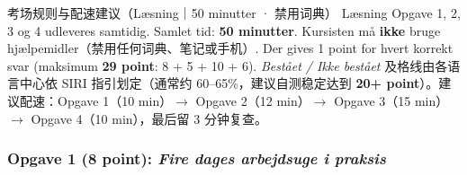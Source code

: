 

\begin{tipbox}{考场规则与配速建议（Læsning｜50 minutter · 禁用词典）}
\small
Læsning Opgave 1, 2, 3 og 4 udleveres samtidig. Samlet tid: \textbf{50 minutter}. Kursisten må \textbf{ikke} bruge hjælpemidler（禁用任何词典、笔记或手机）. Der gives 1 point for hvert korrekt svar (maksimum \textbf{29 point}: 8 + 5 + 10 + 6). \textit{Bestået / Ikke bestået} 及格线由各语言中心依 SIRI 指引划定（通常约 60--65\%，建议自测稳定达到 \textbf{20+ point}）。建议配速：Opgave 1（10 min）$\rightarrow$ Opgave 2（12 min）$\rightarrow$ Opgave 3（15 min）$\rightarrow$ Opgave 4（10 min），最后留 3 分钟复查。
\end{tipbox}

\subsubsection*{Opgave 1 (8 point): \textit{Fire dages arbejdsuge i praksis}}

